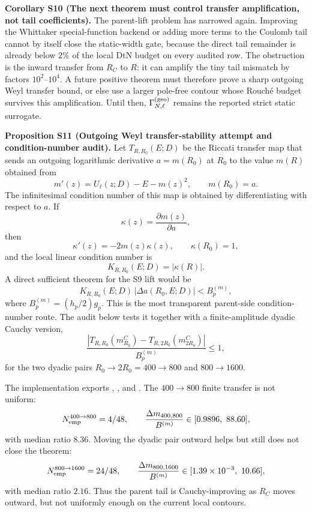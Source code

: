 \documentclass[aps,prd,onecolumn,notitlepage,nofootinbib,superscriptaddress,11pt,floatfix]{revtex4-2}
\begin{document}
\medskip\noindent\textbf{Corollary S10 (The next theorem must control transfer amplification, not tail coefficients).}
The parent-lift problem has narrowed again.  Improving the Whittaker special-function backend or adding more terms to the Coulomb tail cannot by itself close the static-width gate, because the direct tail remainder is already below \(2\%\) of the local DtN budget on every audited row.  The obstruction is the inward transfer from \(R_C\) to \(R\): it can amplify the tiny tail mismatch by factors \(10^2\)--\(10^4\).  A future positive theorem must therefore prove a sharp outgoing Weyl transfer bound, or else use a larger pole-free contour whose Rouché budget survives this amplification.  Until then, \(\Gamma_{N,\ell}^{\rm(geo)}\) remains the reported strict static surrogate.

\medskip\noindent\textbf{Proposition S11 (Outgoing Weyl transfer-stability attempt and condition-number audit).}
Let \(T_{R,R_0}(E;D)\) be the Riccati transfer map that sends an outgoing logarithmic derivative \(a=m(R_0)\) at \(R_0\) to the value \(m(R)\) obtained from
\[
m'(z)=U_\ell(z;D)-E-m(z)^2,
\qquad m(R_0)=a .
\]
The infinitesimal condition number of this map is obtained by differentiating with respect to \(a\).  If
\[
\kappa(z)=\frac{\partial m(z)}{\partial a},
\]
then
\[
\kappa'(z)=-2m(z)\kappa(z),\qquad \kappa(R_0)=1,
\]
and the local linear condition number is
\[
K_{R,R_0}(E;D)=|\kappa(R)|.
\]
A direct sufficient theorem for the S9 lift would be
\[
K_{R,R_0}(E;D)\,|\Delta a(R_0,E;D)|
<
B_p^{(m)},
\]
where \(B_p^{(m)}=(h_p/2)g_p\).  This is the most transparent parent-side condition-number route.  The audit below tests it together with a finite-amplitude dyadic Cauchy version,
\[
\frac{|T_{R,R_0}(m_{R_0}^{C})-T_{R,2R_0}(m_{2R_0}^{C})|}
{B_p^{(m)}}\le 1,
\]
for the two dyadic pairs \(R_0\to2R_0=400\to800\) and \(800\to1600\).

The implementation  exports , , and .  The \(400\to800\) finite transfer is not uniform:
\[
N_{\rm emp}^{400\to800}=4/48,\qquad
\frac{\Delta m_{400,800}}{B^{(m)}}\in[0.9896,\ 88.60],
\]
with median ratio \(8.36\).  Moving the dyadic pair outward helps but still does not close the theorem:
\[
N_{\rm emp}^{800\to1600}=24/48,\qquad
\frac{\Delta m_{800,1600}}{B^{(m)}}\in[1.39\times10^{-3},\ 10.66],
\]
with median ratio \(2.16\).  Thus the parent tail is Cauchy-improving as \(R_C\) moves outward, but not uniformly enough on the current local contours.
\end{document}
